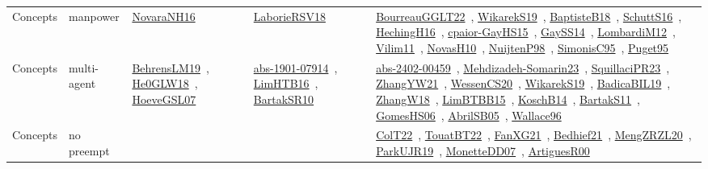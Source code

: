 {\begin{longtable}{lp{3cm}>{\raggedright\arraybackslash}p{6cm}>{\raggedright\arraybackslash}p{6cm}>{\raggedright\arraybackslash}p{8cm}}
Concepts & manpower & \href{articles/NovaraNH16.pdf}{NovaraNH16}~\cite{NovaraNH16} & \href{articles/LaborieRSV18.pdf}{LaborieRSV18}~\cite{LaborieRSV18} & \href{articles/BourreauGGLT22.pdf}{BourreauGGLT22}~\cite{BourreauGGLT22}, \href{articles/WikarekS19.pdf}{WikarekS19}~\cite{WikarekS19}, \href{articles/BaptisteB18.pdf}{BaptisteB18}~\cite{BaptisteB18}, \href{papers/SchuttS16.pdf}{SchuttS16}~\cite{SchuttS16}, \href{papers/HechingH16.pdf}{HechingH16}~\cite{HechingH16}, \href{papers/cpaior-GayHS15.pdf}{cpaior-GayHS15}~\cite{cpaior-GayHS15}, \href{papers/GaySS14.pdf}{GaySS14}~\cite{GaySS14}, \href{articles/LombardiM12.pdf}{LombardiM12}~\cite{LombardiM12}, \href{papers/Vilim11.pdf}{Vilim11}~\cite{Vilim11}, \href{articles/NovasH10.pdf}{NovasH10}~\cite{NovasH10}, \href{articles/NuijtenP98.pdf}{NuijtenP98}~\cite{NuijtenP98}, \href{papers/SimonisC95.pdf}{SimonisC95}~\cite{SimonisC95}, \href{papers/Puget95.pdf}{Puget95}~\cite{Puget95}\\
Concepts & multi-agent & \href{papers/BehrensLM19.pdf}{BehrensLM19}~\cite{BehrensLM19}, \href{papers/He0GLW18.pdf}{He0GLW18}~\cite{He0GLW18}, \href{papers/HoeveGSL07.pdf}{HoeveGSL07}~\cite{HoeveGSL07} & \href{articles/abs-1901-07914.pdf}{abs-1901-07914}~\cite{abs-1901-07914}, \href{papers/LimHTB16.pdf}{LimHTB16}~\cite{LimHTB16}, \href{articles/BartakSR10.pdf}{BartakSR10}~\cite{BartakSR10} & \href{articles/abs-2402-00459.pdf}{abs-2402-00459}~\cite{abs-2402-00459}, \href{papers/Mehdizadeh-Somarin23.pdf}{Mehdizadeh-Somarin23}~\cite{Mehdizadeh-Somarin23}, \href{papers/SquillaciPR23.pdf}{SquillaciPR23}~\cite{SquillaciPR23}, \href{articles/ZhangYW21.pdf}{ZhangYW21}~\cite{ZhangYW21}, \href{papers/WessenCS20.pdf}{WessenCS20}~\cite{WessenCS20}, \href{articles/WikarekS19.pdf}{WikarekS19}~\cite{WikarekS19}, \href{papers/BadicaBIL19.pdf}{BadicaBIL19}~\cite{BadicaBIL19}, \href{articles/ZhangW18.pdf}{ZhangW18}~\cite{ZhangW18}, \href{papers/LimBTBB15.pdf}{LimBTBB15}~\cite{LimBTBB15}, \href{papers/KoschB14.pdf}{KoschB14}~\cite{KoschB14}, \href{articles/BartakS11.pdf}{BartakS11}~\cite{BartakS11}, \href{papers/GomesHS06.pdf}{GomesHS06}~\cite{GomesHS06}, \href{papers/AbrilSB05.pdf}{AbrilSB05}~\cite{AbrilSB05}, \href{articles/Wallace96.pdf}{Wallace96}~\cite{Wallace96}\\
Concepts & no preempt &  &  & \href{articles/ColT22.pdf}{ColT22}~\cite{ColT22}, \href{papers/TouatBT22.pdf}{TouatBT22}~\cite{TouatBT22}, \href{articles/FanXG21.pdf}{FanXG21}~\cite{FanXG21}, \href{articles/Bedhief21.pdf}{Bedhief21}~\cite{Bedhief21}, \href{articles/MengZRZL20.pdf}{MengZRZL20}~\cite{MengZRZL20}, \href{papers/ParkUJR19.pdf}{ParkUJR19}~\cite{ParkUJR19}, \href{papers/MonetteDD07.pdf}{MonetteDD07}~\cite{MonetteDD07}, \href{articles/ArtiguesR00.pdf}{ArtiguesR00}~\cite{ArtiguesR00}\\

\end{longtable}}
